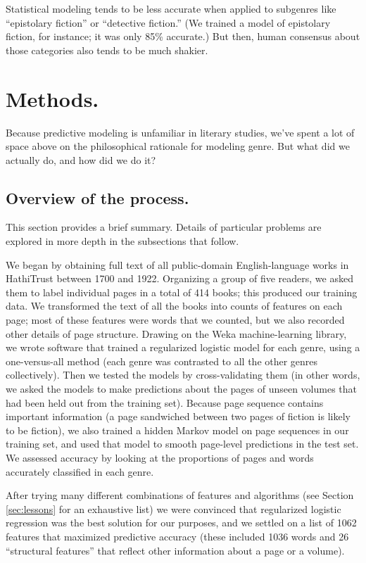 \documentclass[paper=a4, fontsize=12pt]{scrartcl}
\numberwithin{equation}{section}		%
\numberwithin{figure}{section}			%
\numberwithin{table}{section}				%
\begin{document}
Statistical modeling tends to be less accurate when applied to subgenres like ``epistolary fiction'' or ``detective fiction.'' (We trained a model of epistolary fiction, for instance; it was only 85\% accurate.) But then, human consensus about those categories also tends to be much shakier.

\section{Methods.}

Because predictive modeling is unfamiliar in literary studies, we've spent a lot of space above on the philosophical rationale for modeling genre. But what did we actually do, and how did we do it?

\subsection{Overview of the process.}
This section provides a brief summary. Details of particular problems are explored in more depth in the subsections that follow. 

We began by obtaining full text of all public-domain English-language works in HathiTrust between 1700 and 1922. Organizing a group of five readers, we asked them to label individual pages in a total of 414 books; this produced our training data. We transformed the text of all the books into counts of features on each page; most of these features were words that we counted, but we also recorded other details of page structure. Drawing on the Weka machine-learning library, we wrote software that trained a regularized logistic model for each genre, using a one-versus-all method (each genre was contrasted to all the other genres collectively). Then we tested the models by cross-validating them (in other words, we asked the models to make predictions about the pages of unseen volumes that had been held out from the training set). Because page sequence contains important information (a page sandwiched between two pages of fiction is likely to be fiction), we also trained a hidden Markov model on page sequences in our training set, and used that model to smooth page-level predictions in the test set. We assessed accuracy by looking at the proportions of pages and words accurately classified in each genre.

After trying many different combinations of features and algorithms (see Section \ref{sec:lessons} for an exhaustive list) we were convinced that regularized logistic regression was the best solution for our purposes, and we settled on a list of 1062 features that maximized predictive accuracy (these included 1036 words and 26 ``structural features'' that reflect other information about a page or a volume).
\end{document}
